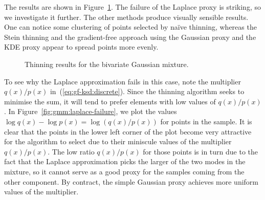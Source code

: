 \documentclass[11pt,a4paper]{report}
\begin{document}

The results are shown in Figure~\ref{fig:gmm:thinned}. The failure of the Laplace proxy is striking, so we investigate it further. The other methods produce visually sensible results. One can notice some clustering of points selected by na\"ive thinning, whereas the Stein thinning and the gradient-free approach using the Gaussian proxy and the KDE proxy appear to spread points more evenly.

\begin{figure}[h]
\centering
{}
\caption{Thinning results for the bivariate Gaussian mixture.
\label{fig:gmm:thinned}}
\end{figure}

To see why the Laplace approximation fails in this case, note the multiplier $q(x) / p(x)$ in~(\ref{eq:gf-ksd:discrete}). Since the thinning algorithm seeks to minimise the sum, it will tend to prefer elements with low values of $q(x) / p(x)$. In Figure~\ref{fig:gmm:laplace-failure}, we plot the values $\log q(x) - \log p(x) = \log (q(x) / p(x))$ for points in the sample. It is clear that the points in the lower left corner of the plot become very attractive for the algorithm to select due to their miniscule values of the multiplier $q(x) / p(x)$. The low ratio $q(x) / p(x)$ for those points is in turn due to the fact that the Laplace approximation picks the larger of the two modes in the mixture, so it cannot serve as a good proxy for the samples coming from the other component. By contract, the simple Gaussian proxy achieves more uniform values of the multiplier.
\end{document}

